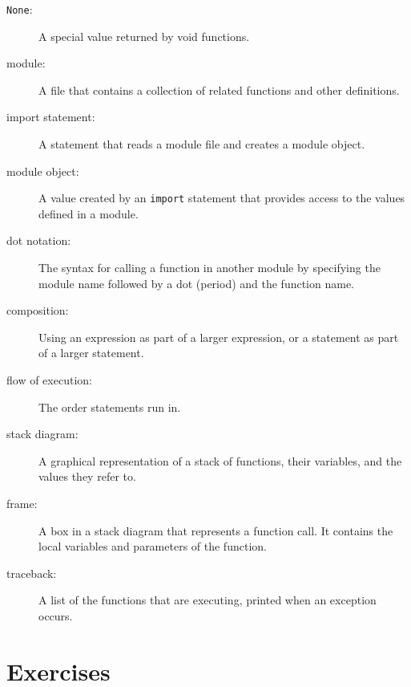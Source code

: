 \documentclass[10pt]{book}
\begin{document}
\begin{description}
\item[{\tt None}:]  A special value returned by void functions.

\item[module:] A file that contains a
collection of related functions and other definitions.

\item[import statement:] A statement that reads a module file and creates
a module object.

\item[module object:] A value created by an {\tt import} statement
that provides access to the values defined in a module.

\item[dot notation:]  The syntax for calling a function in another
module by specifying the module name followed by a dot (period) and
the function name.

\item[composition:] Using an expression as part of a larger expression,
or a statement as part of a larger statement.

\item[flow of execution:]  The order statements run in.

\item[stack diagram:]  A graphical representation of a stack of functions,
their variables, and the values they refer to.

\item[frame:]  A box in a stack diagram that represents a function call.
It contains the local variables and parameters of the function.

\item[traceback:]  A list of the functions that are executing,
printed when an exception occurs.


\end{description}


\section{Exercises}
\end{document}

